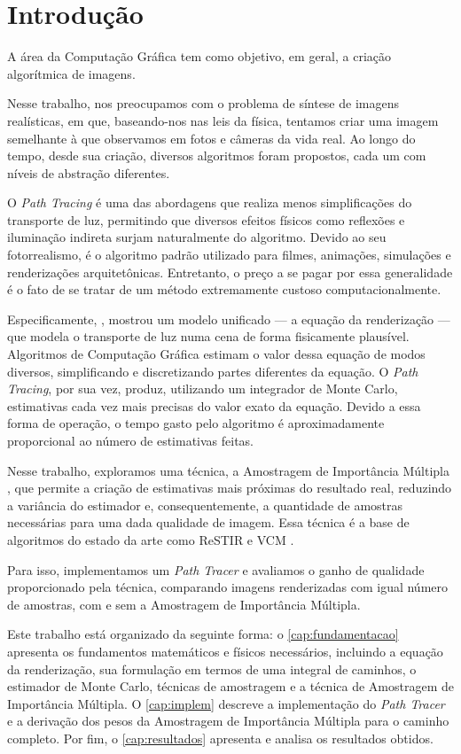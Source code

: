 \chapter{Introdução}

A área da Computação Gráfica tem como objetivo, em geral, a criação algorítmica
de imagens.

Nesse trabalho, nos preocupamos com o problema de síntese de imagens
realísticas, em que, baseando-nos nas leis da física, tentamos criar uma imagem
semelhante à que observamos em fotos e câmeras da vida real. Ao longo do tempo,
desde sua criação, diversos algoritmos foram propostos, cada um com níveis de
abstração diferentes.

O \emph{Path Tracing} é uma das abordagens que realiza menos simplificações do
transporte de luz, permitindo que diversos efeitos físicos como reflexões e
iluminação indireta surjam naturalmente do algoritmo. Devido ao seu
fotorrealismo, é o algoritmo padrão utilizado para filmes, animações,
simulações e renderizações arquitetônicas. Entretanto, o preço a se pagar por
essa generalidade é o fato de se tratar de um método extremamente custoso
computacionalmente.

Especificamente, \citet{kajiya86}, mostrou um modelo unificado --- a equação da
renderização --- que modela o transporte de luz numa cena de forma fisicamente
plausível. Algoritmos de Computação Gráfica estimam o valor dessa equação de
modos diversos, simplificando e discretizando partes diferentes da equação. O
\emph{Path Tracing}, por sua vez, produz, utilizando um integrador de Monte
Carlo, estimativas cada vez mais precisas do valor exato da equação. Devido a
essa forma de operação, o tempo gasto pelo algoritmo é aproximadamente
proporcional ao número de estimativas feitas.

Nesse trabalho, exploramos uma técnica, a Amostragem de Importância Múltipla
\citep{veach95}, que permite a criação de estimativas mais próximas do
resultado real, reduzindo a variância do estimador e, consequentemente,
a quantidade de amostras necessárias para uma dada qualidade de imagem. Essa
técnica é a base de algoritmos do estado da arte como ReSTIR
\citep{bitterli20} e VCM \citep{georgiev12}.

Para isso, implementamos um \emph{Path Tracer} e avaliamos o ganho de
qualidade proporcionado pela técnica, comparando imagens renderizadas com igual
número de amostras, com e sem a Amostragem de Importância Múltipla.

Este trabalho está organizado da seguinte forma: o \autoref{cap:fundamentacao}
apresenta os fundamentos matemáticos e físicos necessários, incluindo a equação
da renderização, sua formulação em termos de uma integral de caminhos, o
estimador de Monte Carlo, técnicas de amostragem e a técnica de Amostragem de
Importância Múltipla. O \autoref{cap:implem} descreve a implementação do
\emph{Path Tracer} e a derivação dos pesos da Amostragem de Importância
Múltipla para o caminho completo. Por fim, o \autoref{cap:resultados} apresenta
e analisa os resultados obtidos.


